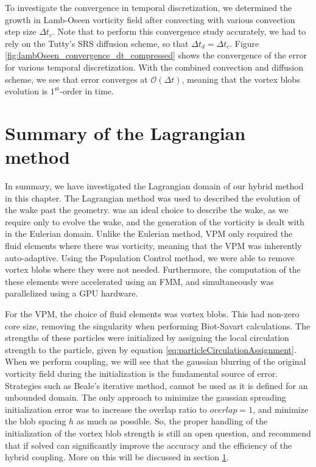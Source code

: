 To investigate the convergence in temporal discretization, we determined the growth in Lamb-Oseen vorticity field after convecting with various convection step size $\Delta t_c$. Note that to perform this convergence study accurately, we had to rely on the Tutty's SRS diffusion scheme, so that $\Delta t_d = \Delta t_c$. Figure \ref{fig:lambOseen_convergence_dt_compressed} shows the convergence of the error for various temporal discretization. With the combined convection and diffusion scheme, we see that error converges at $\mathcal{O}(\Delta t)$, meaning that the vortex blobs evolution is $1^{\mathrm{st}}$-order in time.




\section{Summary of the Lagrangian method}

In summary, we have investigated the Lagrangian domain of our hybrid method in this chapter. The Lagrangian method was used to described the evolution of the wake past the geometry.  was an ideal choice to describe the wake, as we require only to evolve the wake, and the generation of the vorticity is dealt with in the Eulerian domain. Unlike the Eulerian method, VPM only required the fluid elements where there was vorticity, meaning that the VPM was inherently auto-adaptive. Using the Population Control method, we were able to remove vortex blobs where they were not needed. Furthermore, the computation of the these elements were accelerated using an FMM, and simultaneously was parallelized using a GPU hardware. 

For the VPM, the choice of fluid elements was vortex blobs. This had non-zero core size, removing the singularity when performing Biot-Savart calculations. The strengths of these particles were initialized by assigning the local circulation strength to the particle, given by equation \ref{eq:particleCirculationAssignment}. When we perform coupling, we will see that the gaussian blurring of the original vorticity field during the initialization is the fundamental source of error. Strategies such as Beale's iterative method, cannot be used as it is defined for an unbounded domain. The only approach to minimize the gaussian spreading initialization error was to increase the overlap ratio to $overlap=1$, and minimize the blob spacing $h$ as much as possible. So, the proper handling of the initialization of the vortex blob strength is still an open question, and recommend that if solved can significantly improve the accuracy and the efficiency of the hybrid coupling. More on this will be discussed in section \ref{}. 

